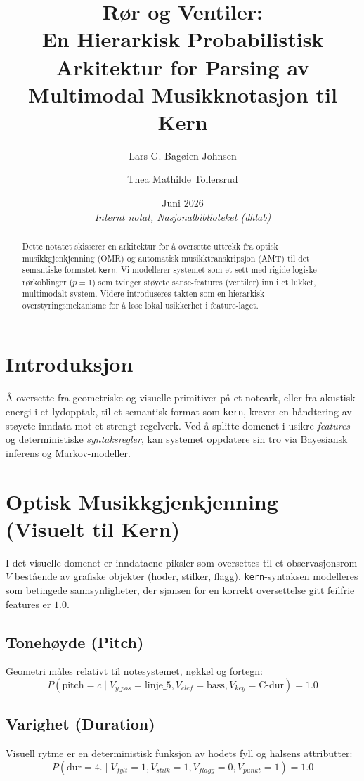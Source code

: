 \documentclass[11pt, a4paper]{article}
\title{Rør og Ventiler:\\En Hierarkisk Probabilistisk Arkitektur for Parsing av Multimodal Musikknotasjon til Kern}
\author{Lars G. Bagøien Johnsen \and Thea Mathilde Tollersrud}
\date{Juni 2026 \\ \vspace{0.5cm} \small \textit{Internt notat, Nasjonalbiblioteket (dhlab)}}
\begin{document}
\maketitle

\begin{abstract}
Dette notatet skisserer en arkitektur for å oversette uttrekk fra optisk musikkgjenkjenning (OMR) og automatisk musikktranskripsjon (AMT) til det semantiske formatet \texttt{kern}. Vi modellerer systemet som et sett med rigide logiske rørkoblinger ($p=1$) som tvinger støyete sanse-features (ventiler) inn i et lukket, multimodalt system. Videre introduseres takten som en hierarkisk overstyringsmekanisme for å løse lokal usikkerhet i feature-laget.
\end{abstract}

\section{Introduksjon}
Å oversette fra geometriske og visuelle primitiver på et noteark, eller fra akustisk energi i et lydopptak, til et semantisk format som \texttt{kern}, krever en håndtering av støyete inndata mot et strengt regelverk. Ved å splitte domenet i usikre \textit{features} og deterministiske \textit{syntaksregler}, kan systemet oppdatere sin tro via Bayesiansk inferens og Markov-modeller.

\section{Optisk Musikkgjenkjenning (Visuelt til Kern)}
I det visuelle domenet er inndataene piksler som oversettes til et observasjonsrom $V$ bestående av grafiske objekter (hoder, stilker, flagg). \texttt{kern}-syntaksen modelleres som betingede sannsynligheter, der sjansen for en korrekt oversettelse gitt feilfrie features er $1.0$.

\subsection{Tonehøyde (Pitch)}
Geometri måles relativt til notesystemet, nøkkel og fortegn:
\begin{equation}
    P(\text{pitch} = c \mid V_{y\_pos} = \text{linje\_5}, V_{clef} = \text{bass}, V_{key} = \text{C-dur}) = 1.0
\end{equation}

\subsection{Varighet (Duration)}
Visuell rytme er en deterministisk funksjon av hodets fyll og halsens attributter:
\begin{equation}
    P(\text{dur} = 4. \mid V_{fylt} = 1, V_{stilk} = 1, V_{flagg} = 0, V_{punkt} = 1) = 1.0
\end{equation}
\end{document}
